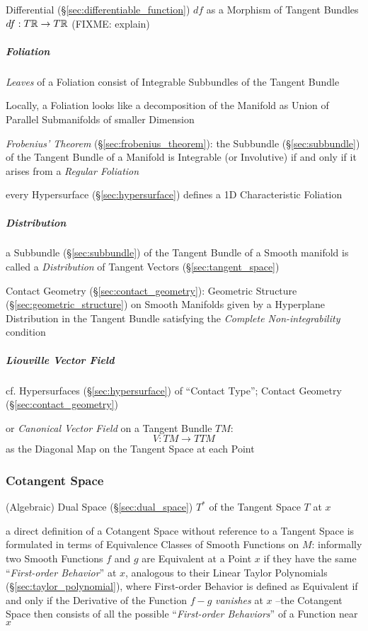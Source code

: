 Differential (\S\ref{sec:differentiable_function}) $df$ as a Morphism of
Tangent Bundles $df : T\mathbb{R} \rightarrow T\mathbb{R}$ (FIXME: explain)



\subparagraph{Foliation}\label{sec:foliation}\hfill

\emph{Leaves} of a Foliation consist of Integrable Subbundles of the Tangent
Bundle

Locally, a Foliation looks like a decomposition of the Manifold as Union of
Parallel Submanifolds of smaller Dimension

\emph{Frobenius' Theorem} (\S\ref{sec:frobenius_theorem}): the Subbundle
(\S\ref{sec:subbundle}) of the Tangent Bundle of a Manifold is Integrable (or
Involutive) if and only if it arises from a \emph{Regular Foliation}

every Hypersurface (\S\ref{sec:hypersurface}) defines a 1D Characteristic
Foliation



\subparagraph{Distribution}\label{sec:tangent_bundle_distribution}\hfill

a Subbundle (\S\ref{sec:subbundle}) of the Tangent Bundle of a Smooth manifold
is called a \emph{Distribution} of Tangent Vectors (\S\ref{sec:tangent_space})

\fist Contact Geometry (\S\ref{sec:contact_geometry}): Geometric Structure
(\S\ref{sec:geometric_structure}) on Smooth Manifolds given by a Hyperplane
Distribution in the Tangent Bundle satisfying the \emph{Complete
  Non-integrability} condition



\subparagraph{Liouville Vector Field}\label{sec:liouville_vector_field}\hfill

cf. Hypersurfaces (\S\ref{sec:hypersurface}) of ``Contact Type''; \fist Contact
Geometry (\S\ref{sec:contact_geometry})

or \emph{Canonical Vector Field} on a Tangent Bundle $TM$:
\[
  V : TM \rightarrow TTM
\]
as the Diagonal Map on the Tangent Space at each Point



\subsubsection{Cotangent Space}\label{sec:cotangent_space}

(Algebraic) Dual Space (\S\ref{sec:dual_space}) $T^*$ of the Tangent Space $T$
at $x$

a direct definition of a Cotangent Space without reference to a Tangent Space
is formulated in terms of Equivalence Classes of Smooth Functions on $M$:
informally two Smooth Functions $f$ and $g$ are Equivalent at a Point $x$ if
they have the same ``\emph{First-order Behavior}'' at $x$, analogous to their
Linear Taylor Polynomials (\S\ref{sec:taylor_polynomial}), where First-order
Behavior is defined as Equivalent if and only if the Derivative of the Function
$f-g$ \emph{vanishes} at $x$ --the Cotangent Space then consists of all the
possible ``\emph{First-order Behaviors}'' of a Function near $x$

